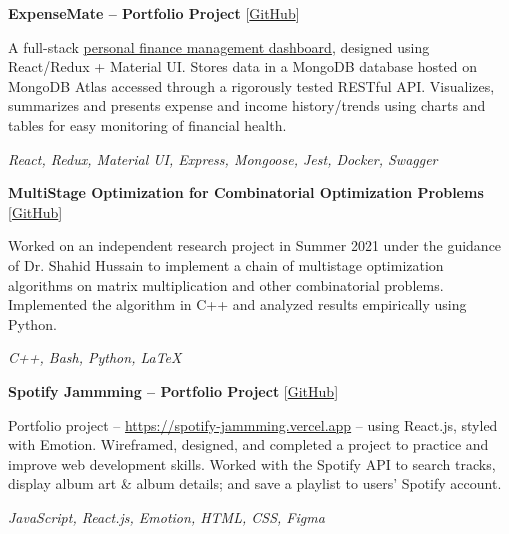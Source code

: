 \documentclass[12pt, a4paper]{article}
\begin{document}
\textbf{ExpenseMate -- Portfolio Project}	\hfill [\href{https://github.com/m-usaid99/ExpenseMate}{GitHub}]
\begin{center}
	\parbox{0.9\linewidth}{
		A full-stack \href{https://expensemate.vercel.app}{personal finance management dashboard}, designed using React/Redux + Material UI. Stores data in a MongoDB database hosted on MongoDB Atlas accessed through a rigorously tested RESTful API. Visualizes, summarizes and presents expense and income history/trends using charts and tables for easy monitoring of financial health.

		\textit{React, Redux, Material UI, Express, Mongoose, Jest, Docker, Swagger}
	}
\end{center}


\textbf{MultiStage Optimization for Combinatorial Optimization Problems} \hfill [\href{https://github.com/m-usaid/Research-CombinatorialOptimization-DynamicProgramming}{GitHub}]
\begin{center}
	\parbox{0.9\linewidth}{
		Worked on an independent research project in Summer 2021 under the guidance of Dr. Shahid Hussain to implement a chain of multistage optimization algorithms on matrix multiplication and other combinatorial problems. Implemented the algorithm in C++ and analyzed results empirically using Python.

		\textit{C++, Bash, Python, \LaTeX}
	}
\end{center}

\newpage

\textbf{ Spotify Jammming -- Portfolio Project} \hfill [\href{https://github.com/m-usaid99/spotify-jammming}{GitHub}]
\begin{center}
	\parbox{0.9\linewidth}{
		Portfolio project -- \url{https://spotify-jammming.vercel.app} -- using React.js, styled with Emotion. Wireframed, designed, and completed a project to practice and improve web development skills. Worked with the Spotify API to search tracks, display album art \& album details; and save a playlist to users' Spotify account.

		\textit{JavaScript, React.js, Emotion, HTML, CSS, Figma}
	}
\end{center}
\end{document}
